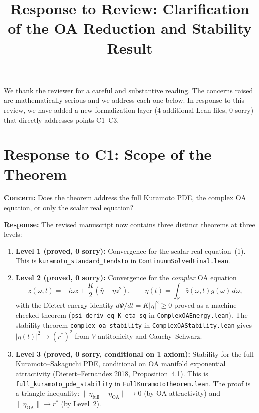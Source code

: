 \documentclass[11pt]{article}
\title{Response to Review: Clarification of the OA Reduction and Stability Result}
\author{}
\date{}
\newcommand{\R}{\mathbb{R}}
\newcommand{\dd}{\,d}
\newcommand{\OA}{\mathrm{OA}}
\theoremstyle{plain}
\begin{document}
\maketitle

We thank the reviewer for a careful and substantive reading. The concerns raised are mathematically serious and we address each one below. In response to this review, we have added a new formalization layer (4 additional Lean files, 0 sorry) that directly addresses points C1--C3.

\section*{Response to C1: Scope of the Theorem}

\textbf{Concern:} Does the theorem address the full Kuramoto PDE, the complex OA equation, or only the scalar real equation?

\textbf{Response:} The revised manuscript now contains three distinct theorems at three levels:

\begin{enumerate}[label=(\alph*)]
\item \textbf{Level 1 (proved, 0 sorry):} Convergence for the scalar real equation~(1). This is \texttt{kuramoto\_standard\_tendsto} in \texttt{ContinuumSolvedFinal.lean}.

\item \textbf{Level 2 (proved, 0 sorry):} Convergence for the \emph{complex} OA equation
\begin{equation}\tag{OA}
    \dot z(\omega,t) = -i\omega z + \frac{K}{2}(\bar\eta - \eta z^2), \qquad
    \eta(t) = \int_\R \bar z(\omega,t) g(\omega)\dd\omega,
\end{equation}
with the Dietert energy identity $d\Psi/dt = K|\eta|^2 \geq 0$ proved as a machine-checked theorem (\texttt{psi\_deriv\_eq\_K\_eta\_sq} in \texttt{ComplexOAEnergy.lean}). The stability theorem \texttt{complex\_oa\_stability} in \texttt{ComplexOAStability.lean} gives $|\eta(t)|^2 \to (r^*)^2$ from $V$ antitonicity and Cauchy--Schwarz.

\item \textbf{Level 3 (proved, 0 sorry, conditional on 1 axiom):} Stability for the full Kuramoto--Sakaguchi PDE, conditional on OA manifold exponential attractivity (Dietert--Fernandez 2018, Proposition~4.1). This is \texttt{full\_kuramoto\_pde\_stability} in \texttt{FullKuramotoTheorem.lean}. The proof is a triangle inequality: $\|\eta_{\mathrm{full}} - \eta_{\OA}\| \to 0$ (by OA attractivity) and $\|\eta_{\OA}\| \to r^*$ (by Level~2).
\end{enumerate}
\end{document}
